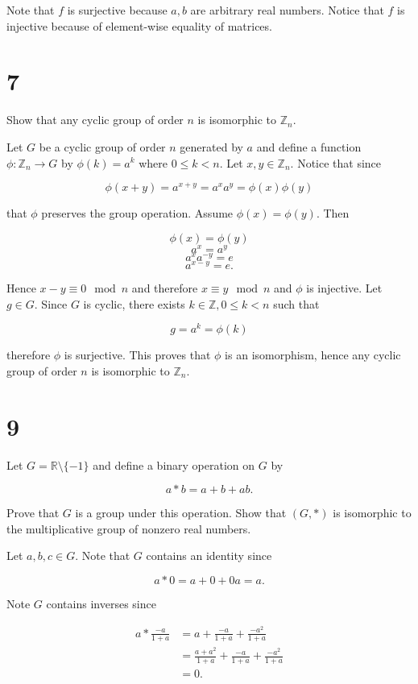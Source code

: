 \documentclass[a4paper]{article}
\begin{document}
Note that $f$ is surjective because $a,b$ are arbitrary real numbers. Notice that $f$ is injective because of element-wise equality of matrices.


\section*{7}

Show that any cyclic group of order $n$ is isomorphic to $\mathbb{Z}_n$.

\vspace{\baselineskip}

Let $G$ be a cyclic group of order $n$ generated by $a$ and define a function $\phi : \mathbb{Z}_n \rightarrow G$ by $\phi(k) = a^k$ where $0 \leq k < n$. Let $x,y \in \mathbb{Z}_n$. 
Notice that since

$$\phi(x + y) = a^{x+y} = a^x a^y = \phi(x) \phi(y)$$

that $\phi$ preserves the group operation. Assume $\phi(x) = \phi(y)$. Then

$$\phi(x) = \phi(y)$$
$$a^x = a^y$$
$$a^x a^{-y} = e$$
$$a^{x-y} = e.$$

Hence $x - y \equiv 0 \mod n$ and therefore $x \equiv y \mod n$ and $\phi$ is injective. Let $g \in G$. Since $G$ is cyclic, there exists $k \in \mathbb{Z}, 0 \leq k < n$ such that

$$g = a^k = \phi(k)$$

therefore $\phi$ is surjective. This proves that $\phi$ is an isomorphism, hence any cyclic group of order $n$ is isomorphic to $\mathbb{Z}_n$.


\section*{9}

Let $G = \mathbb{R} \setminus \{ -1 \}$ and define a binary operation on $G$ by 

$$a * b = a + b + ab.$$

Prove that $G$ is a group under this operation. Show that $(G, *)$ is isomorphic to the multiplicative group of nonzero real numbers.

\vspace{\baselineskip}

Let $a,b,c \in G$. Note that $G$ contains an identity since

$$a * 0 = a + 0 + 0a = a.$$

Note $G$ contains inverses since

\begin{align*}
a * \frac{-a}{1+a} &= a + \frac{-a}{1+a} + \frac{-a^2}{1+a} \\
&= \frac{a + a^2}{1+a} + \frac{-a}{1+a} + \frac{-a^2}{1+a} \\ 
&= 0.
\end{align*}
\end{document}
